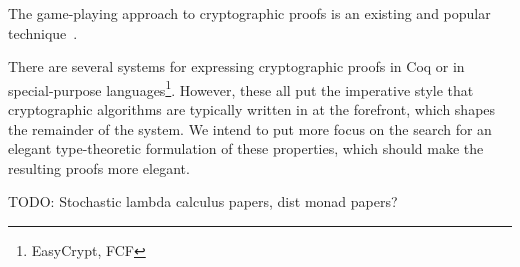 The game-playing approach to cryptographic proofs is an existing and popular technique~\cite{codebasedgames}.

There are several systems for expressing cryptographic proofs in Coq or in special-purpose
languages\footnote{EasyCrypt, FCF}.  However, these all put the imperative style that cryptographic algorithms are
typically written in at the forefront, which shapes the remainder of the system.  We intend to put more focus on the
search for an elegant type-theoretic formulation of these properties, which should make the resulting proofs more
elegant.

TODO: Stochastic lambda calculus papers, dist monad papers?
